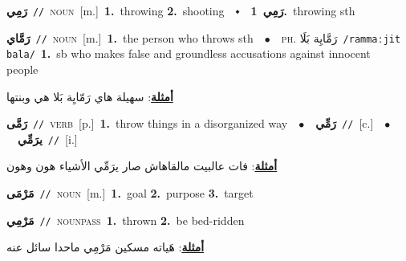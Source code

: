 \documentclass[10pt,a4paper,twoside]{article} %
\begin{document}
\begin{multicols}{2}
{\setlength\topsep{0pt}\textbf{\foreignlanguage{arabic}{رَمِي}}\ {\color{gray}\texttt{//}\color{black}}\ \textsc{noun}\ [m.]\ \textbf{1.}~throwing  \textbf{2.}~shooting\ \ $\smblkdiamond$\ \ \setlength\topsep{0pt}\textbf{\foreignlanguage{arabic}{رَمِي}}\ \textbf{1.}~throwing sth\ } \vspace{2mm}

{\setlength\topsep{0pt}\textbf{\foreignlanguage{arabic}{رَمَّاي}}\ {\color{gray}\texttt{//}\color{black}}\ \textsc{noun}\ [m.]\ \textbf{1.}~the person who throws sth\ \ $\bullet$\ \ \textsc{ph.} \color{gray} \foreignlanguage{arabic}{رَمَّايِة بَلَا}\color{black}\ {\color{gray}\texttt{/{\sffamily rammaːjit bala}/}\color{black}}\ \textbf{1.}~sb who makes false and groundless accusations against innocent people\  \begin{flushright}\color{gray}\foreignlanguage{arabic}{\textbf{\underline{\foreignlanguage{arabic}{أمثلة}}}: سهيلة هاي رَمّايِة بَلا هي وبنتها}\end{flushright}\color{black}} \vspace{2mm}

{\setlength\topsep{0pt}\textbf{\foreignlanguage{arabic}{رَمَّى}}\ {\color{gray}\texttt{//}\color{black}}\ \textsc{verb}\ [p.]\ \textbf{1.}~throw things in a disorganized way\ \ $\bullet$\ \ \setlength\topsep{0pt}\textbf{\foreignlanguage{arabic}{رَمِّي}}\ {\color{gray}\texttt{//}\color{black}}\ [c.]\ \ $\bullet$\ \ \setlength\topsep{0pt}\textbf{\foreignlanguage{arabic}{يرَمِّي}}\ {\color{gray}\texttt{//}\color{black}}\ [i.]\  \begin{flushright}\color{gray}\foreignlanguage{arabic}{\textbf{\underline{\foreignlanguage{arabic}{أمثلة}}}: فات عالبيت مالقاهاش صار يرَمِّي الأشياء هون وهون}\end{flushright}\color{black}} \vspace{2mm}

{\setlength\topsep{0pt}\textbf{\foreignlanguage{arabic}{مَرْمَى}}\ {\color{gray}\texttt{//}\color{black}}\ \textsc{noun}\ [m.]\ \textbf{1.}~goal  \textbf{2.}~purpose  \textbf{3.}~target\ } \vspace{2mm}

{\setlength\topsep{0pt}\textbf{\foreignlanguage{arabic}{مَرْمِي}}\ {\color{gray}\texttt{//}\color{black}}\ \textsc{noun\textunderscore pass}\ \textbf{1.}~thrown  \textbf{2.}~be bed-ridden\  \begin{flushright}\color{gray}\foreignlanguage{arabic}{\textbf{\underline{\foreignlanguage{arabic}{أمثلة}}}: هَياته مسكين مَرْمِي ماحدا سائل عنه}\end{flushright}\color{black}} \vspace{2mm}


\end{multicols}
\end{document}
